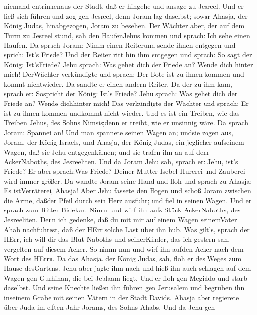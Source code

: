 niemand entrinnenaus der Stadt, daß er hingehe und ansage zu Jesreel.
 Und er ließ sich führen und zog gen Jesreel, denn Joram
lag daselbst; sowar Ahasja, der König Judas, hinabgezogen, Joram zu
besehen.  Der Wächter aber, der auf dem Turm zu Jesreel
stund, sah den HaufenJehus kommen und sprach: Ich sehe einen Haufen. Da
sprach Joram: Nimm einen Reiterund sende ihnen entgegen und sprich:
Ist's Friede?  Und der Reiter ritt hin ihm entgegen und
sprach: So sagt der König: Ist'sFriede? Jehu sprach: Was gehet dich der
Friede an? Wende dich hinter mich! DerWächter verkündigte und sprach:
Der Bote ist zu ihnen kommen und kommt nichtwieder.  Da
sandte er einen andern Reiter. Da der zu ihm kam, sprach er: Sospricht
der König: Ist's Friede? Jehu sprach: Was gehet dich der Friede an?
Wende dichhinter mich!  Das verkündigte der Wächter und
sprach: Er ist zu ihnen kommen undkommt nicht wieder. Und es ist ein
Treiben, wie das Treiben Jehus, des Sohns Nimsis;denn er treibt, wie er
unsinnig wäre.  Da sprach Joram: Spannet an! Und man
spannete seinen Wagen an; undsie zogen aus, Joram, der König Israels,
und Ahasja, der König Judas, ein jeglicher aufseinem Wagen, daß sie Jehu
entgegenkämen; und sie trafen ihn an auf dem AckerNaboths, des
Jesreeliten.  Und da Joram Jehu sah, sprach er: Jehu, ist's
Friede? Er aber sprach:Was Friede? Deiner Mutter Isebel Hurerei und
Zauberei wird immer größer.  Da wandte Joram seine Hand und
floh und sprach zu Ahasja: Es istVerräterei, Ahasja!  Aber
Jehu fassete den Bogen und schoß Joram zwischen die Arme, daßder Pfeil
durch sein Herz ausfuhr; und fiel in seinen Wagen.  Und er
sprach zum Ritter Bidekar: Nimm und wirf ihn aufs Stück AckerNaboths,
des Jesreeliten. Denn ich gedenke, daß du mit mir auf einem Wagen
seinemVater Ahab nachfuhrest, daß der HErr solche Last über ihn hub.
 Was gilt's, sprach der HErr, ich will dir das Blut Naboths
und seinerKinder, das ich gestern sah, vergelten auf diesem Acker. So
nimm nun und wirf ihn aufden Acker nach dem Wort des HErrn.
 Da das Ahasja, der König Judas, sah, floh er des Weges zum
Hause desGartens. Jehu aber jagte ihm nach und hieß ihn auch schlagen
auf dem Wagen gen Gurhinan, die bei Jeblaam liegt. Und er floh gen
Megiddo und starb daselbst.  Und seine Knechte ließen ihn
führen gen Jerusalem und begruben ihn inseinem Grabe mit seinen Vätern
in der Stadt Davids.  Ahasja aber regierete über Juda im
elften Jahr Jorams, des Sohns Ahabs.  Und da Jehu gen
